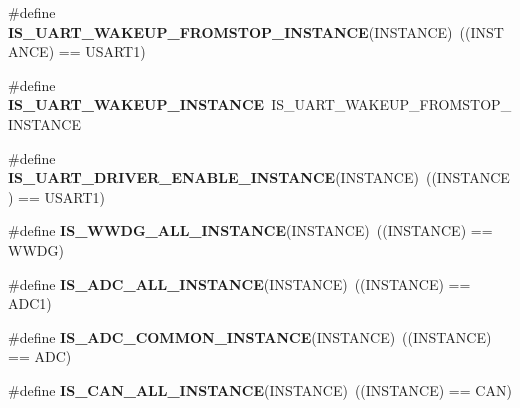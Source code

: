 \begin{DoxyCompactItemize}
\item 
\mbox{\label{group___exported__macro_ga6303097822ab1977cc83f05319a10f1e}} 
\#define {\bfseries I\+S\+\_\+\+U\+A\+R\+T\+\_\+\+W\+A\+K\+E\+U\+P\+\_\+\+F\+R\+O\+M\+S\+T\+O\+P\+\_\+\+I\+N\+S\+T\+A\+N\+CE}(I\+N\+S\+T\+A\+N\+CE)~((I\+N\+S\+T\+A\+N\+CE) == U\+S\+A\+R\+T1)
\item 
\mbox{\label{group___exported__macro_ga69e32d838272d886316fcfa378605ed0}} 
\#define {\bfseries I\+S\+\_\+\+U\+A\+R\+T\+\_\+\+W\+A\+K\+E\+U\+P\+\_\+\+I\+N\+S\+T\+A\+N\+CE}~I\+S\+\_\+\+U\+A\+R\+T\+\_\+\+W\+A\+K\+E\+U\+P\+\_\+\+F\+R\+O\+M\+S\+T\+O\+P\+\_\+\+I\+N\+S\+T\+A\+N\+CE
\item 
\mbox{\label{group___exported__macro_ga98f122ffe4d77f03a13f682301e2d596}} 
\#define {\bfseries I\+S\+\_\+\+U\+A\+R\+T\+\_\+\+D\+R\+I\+V\+E\+R\+\_\+\+E\+N\+A\+B\+L\+E\+\_\+\+I\+N\+S\+T\+A\+N\+CE}(I\+N\+S\+T\+A\+N\+CE)~((I\+N\+S\+T\+A\+N\+CE) == U\+S\+A\+R\+T1)
\item 
\mbox{\label{group___exported__macro_gac2a8aaec233e19987232455643a04d6f}} 
\#define {\bfseries I\+S\+\_\+\+W\+W\+D\+G\+\_\+\+A\+L\+L\+\_\+\+I\+N\+S\+T\+A\+N\+CE}(I\+N\+S\+T\+A\+N\+CE)~((I\+N\+S\+T\+A\+N\+CE) == W\+W\+DG)
\item 
\mbox{\label{group___exported__macro_ga2204b62b378bcf08b3b9006c184c7c23}} 
\#define {\bfseries I\+S\+\_\+\+A\+D\+C\+\_\+\+A\+L\+L\+\_\+\+I\+N\+S\+T\+A\+N\+CE}(I\+N\+S\+T\+A\+N\+CE)~((I\+N\+S\+T\+A\+N\+CE) == A\+D\+C1)
\item 
\mbox{\label{group___exported__macro_gad8a5831c786b6b265531b890a194cbe2}} 
\#define {\bfseries I\+S\+\_\+\+A\+D\+C\+\_\+\+C\+O\+M\+M\+O\+N\+\_\+\+I\+N\+S\+T\+A\+N\+CE}(I\+N\+S\+T\+A\+N\+CE)~((I\+N\+S\+T\+A\+N\+CE) == A\+DC)
\item 
\mbox{\label{group___exported__macro_ga974dd363bcb2a5f48ec032509fd4ece3}} 
\#define {\bfseries I\+S\+\_\+\+C\+A\+N\+\_\+\+A\+L\+L\+\_\+\+I\+N\+S\+T\+A\+N\+CE}(I\+N\+S\+T\+A\+N\+CE)~((I\+N\+S\+T\+A\+N\+CE) == C\+AN)
\item 
\mbox{\label{group___exported__macro_ga10cad35fdea5ffcb9f17973ce98c7dee}} 

\end{DoxyCompactItemize}
